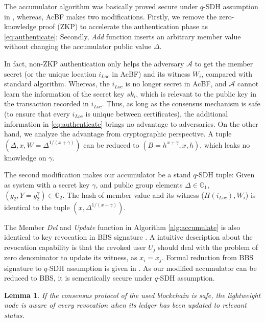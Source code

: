 \documentclass[conference]{IEEEtran}
\newtheorem{lemma}{Lemma}[theorem]
\begin{document}
\begin{IEEEproof}
	The accumulator algorithm was basically proved secure under $q$-SDH assumption in \cite{accumulator}, whereas, AcBF makes two modifications. Firstly, we remove the zero-knowledge proof (ZKP) to accelerate the authentication phase as \eqref{eq:authenticate}; Secondly, \textit{Add} function inserts an arbitrary member value without changing the accumulator public value $\Delta$. 
	
	In fact, non-ZKP authentication only helps the adversary $\mathcal{A}$ to get the member secret (or the unique location $i_{Loc}$ in AcBF) and its witness $W_i$, compared with standard algorithm. Whereas, the $i_{Loc}$ is no longer secret in AcBF, and $\mathcal{A}$ cannot learn the information of the secret key $sk_i$, which is relevant to the public key in the transaction recorded in $i_{Loc}$. Thus, as long as the consensus mechanism is safe (to ensure that every $i_{Loc}$ is unique between certificates), the additional information in \eqref{eq:authenticate} brings no advantage to adversaries. On the other hand, we analyze the advantage from cryptographic perspective. A tuple $(\Delta, x, W = \Delta^{1/(x + \gamma)})$ can be reduced to $(B=h^{x+\gamma}, x, h)$, which leaks no knowledge on $\gamma$.
	
	The second modification makes our accumulator be a stand $q$-SDH tuple: Given as system with a secret key $\gamma$, and public group elements $\Delta \in \mathbb{G}_1$, $(g_2, Y = g_2^\gamma)\in \mathbb{G}_2$. The hash of member value and its witness ($H(i_{Loc}), W_i$) is identical to the tuple $(x, \Delta^{1/(x+\gamma)})$. 

	The Member \textit{Del} and \textit{Update} function in Algorithm \ref{alg:accumulate} is also identical to key revocation in BBS signature \cite{Boneh2004}. A intuitive description about the revocation capability is that the revoked user $U_j$ should deal with the problem of zero denominator to update its witness, as $x_i=x_j$. Formal reduction from BBS signature to $q$-SDH assumption is given in \cite{Boneh2004}. As our modified accumulator can be reduced to BBS, it is sementically secure under $q$-SDH assumption. 
\end{IEEEproof}
\begin{lemma}
    If the consensus protocol of the used blockchain is safe, the lightweight node is aware of every revocation when its ledger has been updated to relevant status.
\end{lemma}
\end{document}
